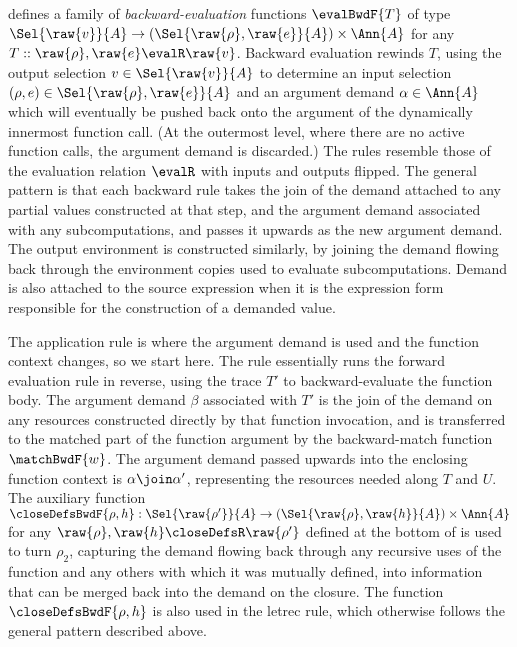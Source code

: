  defines a family of \emph{backward-evaluation} functions $\evalBwdF{T}$ of type $\Sel{\raw{v}}{A} \to (\Sel{\raw{\rho}, \raw{e}}{A}) \times \Ann{A}$ for any $T :: \raw{\rho}, \raw{e} \evalR \raw{v}$. Backward evaluation rewinds $T$, using the output selection $v \in \Sel{\raw{v}}{A}$ to determine an input selection $(\rho, e) \in \Sel{\raw{\rho}, \raw{e}}{A}$ and an argument demand $\alpha \in \Ann{A}$ which will eventually be pushed back onto the argument of the dynamically innermost function call. (At the outermost level, where there are no active function calls, the argument demand is discarded.) The rules resemble those of the evaluation relation $\evalR$ with inputs and outputs flipped. The general pattern is that each backward rule takes the join of the demand attached to any partial values constructed at that step, and the argument demand associated with any subcomputations, and passes it upwards as the new argument demand. The output environment is constructed similarly, by joining the demand flowing back through the environment copies used to evaluate subcomputations. Demand is also attached to the source expression when it is the expression form responsible for the construction of a demanded value.



 The application rule is where the argument demand is used and the function context changes, so we start here. The rule essentially runs the forward evaluation rule in reverse, using the trace $T'$ to backward-evaluate the function body. The argument demand $\beta$ associated with $T'$ is the join of the demand on any resources constructed directly by that function invocation, and is transferred to the matched part of the function argument by the backward-match function $\matchBwdF{w}$. The argument demand passed upwards into the enclosing function context is $\alpha \join \alpha'$, representing the resources needed along $T$ and $U$. The auxiliary function $\smash{\closeDefsBwdF{\rho, h}}: \smash{\Sel{\raw{\rho'}}{A} \to (\Sel{\raw{\rho}, \raw{h}}{A})} \times \Ann{A}$ for any $\raw{\rho}, \raw{h} \closeDefsR \raw{\rho'}$ defined at the bottom of  is used to turn $\rho_2$, capturing the demand flowing back through any recursive uses of the function and any others with which it was mutually defined, into information that can be merged back into the demand on the closure. The function $\closeDefsBwdF{\rho,h}$ is also used in the letrec rule, which otherwise follows the general pattern described above.

